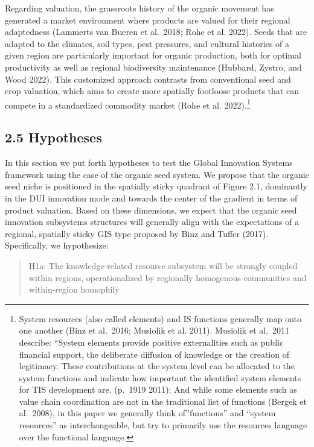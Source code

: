 \documentclass[twoside,12pt,final]{ucthesis-CA2012}
\begin{document}
\begin{ucmainmatter}
Regarding valuation, the grassroots history of the organic movement has
generated a market environment where products are valued for their
regional adaptedness (Lammerts van Bueren et al.~2018; Rohe et al.
2022). Seeds that are
adapted to the climates, soil types, pest pressures, and cultural
histories of a given region are particularly important for organic
production, both for optimal productivity as well as regional
biodiversity maintenance (Hubbard, Zystro, and Wood
2022). This customized
approach contrasts from conventional seed and crop valuation, which aims
to create more spatially footloose products that can compete in a
standardized commodity market (Rohe et al.
2022).\footnote{System resources (also called \textquotesingle elements\textquotesingle) and IS functions
  generally map onto one another (Binz et al.~2016; Musiolik et al.
  2011). Musiolik et al.~2011 describe: ``System elements provide
  positive externalities such as public financial support, the
  deliberate diffusion of knowledge or the creation of legitimacy.
  These contributions at the system level can be allocated to the
  system functions and indicate how important the identified system
  elements for TIS development are.\textquotesingle{} (p.~1919 2011); And while some
  elements such as \textquotesingle value chain coordination\textquotesingle{} are not in the
  traditional list of functions (Bergek et al.~2008), in this paper we
  generally think of''functions'' and ``system resources'' as
  interchangeable, but try to primarily use the \textquotesingle resources\textquotesingle{} language
  over the \textquotesingle functional\textquotesingle{} language.}

\hypertarget{hypotheses-1}{%
\subsection{2.5 Hypotheses}\label{hypotheses-1}}

In this section we put forth hypotheses to test the Global Innovation
Systems framework using the case of the organic seed system. We propose
that the organic seed niche is positioned in the \textquotesingle spatially sticky\textquotesingle{}
quadrant of Figure 2.1, dominantly in the DUI innovation mode and
towards the center of the gradient in terms of product valuation. Based
on these dimensions, we expect that the organic seed innovation
subsystems\textquotesingle{} structures will generally align with the expectations of a
regional, spatially sticky GIS type proposed by Binz and Tuffer (2017).
Specifically, we hypothesize:
\begin{quote}
H1a: The knowledge-related resource subsystem will be strongly coupled
within regions, operationalized by regionally homogenous communities
and within-region homophily


\end{quote}
\end{ucmainmatter}
\end{document}
